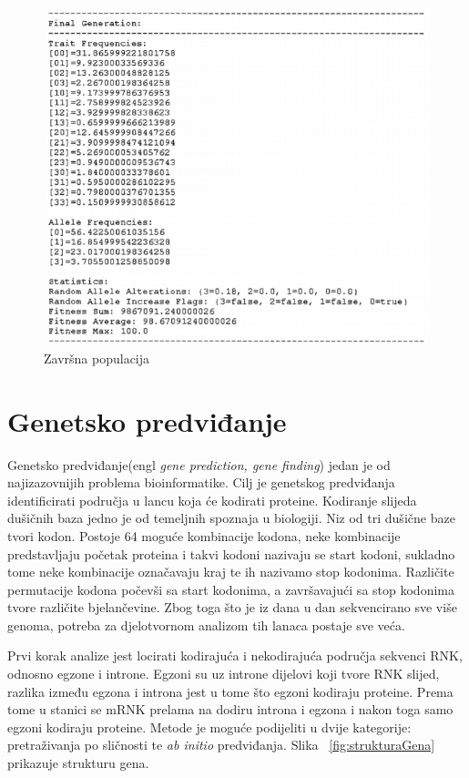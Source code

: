 \documentclass[times, utf8, zavrsni, numeric]{fer}
\begin{document}
\begin{figure}[!httb]
	\includegraphics[]{slike/popDruga.PNG}
	\centering
	\caption{Završna populacija}
	\label{fig:popDruga}
\end{figure}
\newpage
\section{Genetsko predviđanje}
Genetsko predviđanje(engl \textit{gene prediction, gene finding}) jedan je od najizazovnijih problema bioinformatike. Cilj je genetskog predviđanja identificirati područja u lancu koja će kodirati proteine. Kodiranje slijeda dušičnih baza jedno je od temeljnih spoznaja u biologiji. Niz od tri dušične baze tvori kodon. Postoje 64 moguće kombinacije kodona, neke kombinacije predstavljaju početak proteina i takvi kodoni nazivaju se start kodoni, sukladno tome neke kombinacije označavaju kraj te ih nazivamo stop kodonima. Različite permutacije kodona počevši sa start kodonima, a završavajući sa stop kodonima tvore različite bjelančevine. Zbog toga što je iz dana u dan sekvencirano sve više genoma, potreba za djelotvornom analizom tih lanaca postaje sve veća. 

Prvi korak analize jest locirati kodirajuća i nekodirajuća područja sekvenci RNK, odnosno egzone i introne. Egzoni su uz introne dijelovi koji tvore RNK slijed, razlika između egzona i introna jest u tome što egzoni kodiraju proteine. Prema tome u stanici se mRNK prelama na dodiru introna i egzona i nakon toga samo egzoni kodiraju proteine. Metode je moguće podijeliti u dvije kategorije: pretraživanja po sličnosti te \textit{ab initio} predviđanja. Slika ~\ref{fig:strukturaGena} prikazuje strukturu gena.
\end{document}
